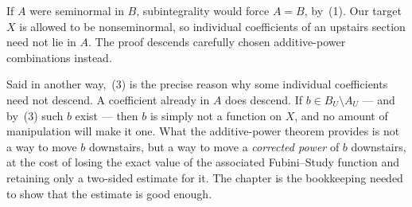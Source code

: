 \begin{remark}
\label{rem:ch44-nonseminormal-shape}
If $A$ were seminormal in $B$, subintegrality would force $A=B$, by
\,(1).
Our target $X$ is allowed to be nonseminormal, so individual coefficients
of an upstairs section need not lie in $A$.
The proof descends carefully chosen additive-power combinations instead.

Said in another way,
\,(3) is the precise reason why
some individual coefficients need not descend.  A coefficient already
in $A$ does descend.  If
$b\in B_U\setminus A_U$ --- and by~(3) such $b$ exist --- then $b$ is
simply not a function on $X$, and no amount of manipulation will make it
one.  What the additive-power theorem provides is not a way to move $b$
downstairs, but a way to move a \emph{corrected power} of $b$ downstairs,
at the cost of losing the exact value of the associated Fubini--Study
function and retaining only a two-sided estimate for it.  The chapter is the
bookkeeping needed to show that the estimate is good enough.
\end{remark}

